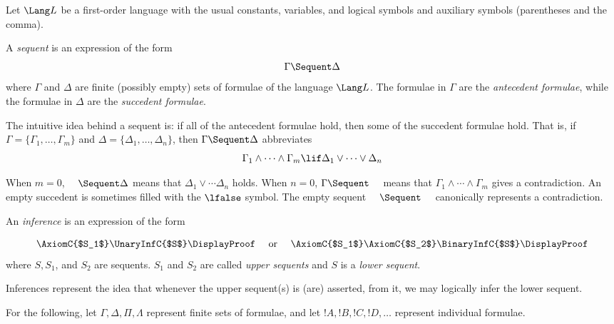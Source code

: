 \documentclass[../../include/open-logic-section]{subfiles}
\begin{document}


Let $\Lang L$ be a first-order language with the usual constants, variables, and logical symbols and auxiliary symbols (parentheses and the comma). 

\begin{defn}[sequent]
A \emph{sequent} is an expression of the form
\[ \Gamma \Sequent \Delta \]
where $\Gamma$ and $\Delta$ are finite (possibly empty) sets of formulae of the language $\Lang L$. The formulae in $\Gamma$ are the \emph{antecedent formulae}, while the formulae in $\Delta$ are the \emph{succedent formulae}. 

The intuitive idea behind a sequent is: if all of the antecedent formulae hold, then some of the succedent formulae hold. That is, if $\Gamma = \{ \Gamma_1,\ldots,\Gamma_m\}$ and $\Delta = \{ \Delta_1,\ldots, \Delta_n\}$, then $\Gamma \Sequent \Delta$ abbreviates
\[ \Gamma_1 \land \cdots \land \Gamma_m \lif \Delta_1 \lor \cdots \lor \Delta_n \]

When $m=0$, $\hspace{1em} \Sequent \Delta$ means that $\Delta_1 \lor \cdots \Delta_n$ holds. When $n=0$, $\Gamma \Sequent \hspace{1em}$ means that $\Gamma_1 \land \cdots \land \Gamma_m$ gives a contradiction. An empty succedent is sometimes filled with the $\lfalse$ symbol. The empty sequent $\hspace{1em} \Sequent \hspace{1em}$ canonically represents a contradiction.
\end{defn}

\begin{defn}[Inference]
An \emph{inference} is an expression of the form

\[
\AxiomC{$S_1$}
\UnaryInfC{$S$}
\DisplayProof
\quad
\textrm{  or  }
\quad
\AxiomC{$S_1$}
\AxiomC{$S_2$}
\BinaryInfC{$S$}
\DisplayProof
\]
where $S, S_1$, and $S_2$ are sequents. $S_1$ and $S_2$ are called \emph{upper sequents} and $S$ is a \emph{lower sequent}.

Inferences represent the idea that whenever the upper sequent(s) is (are) asserted, from it, we may logically infer the lower sequent.
\end{defn}

For the following, let $\Gamma, \Delta, \Pi, \Lambda$ represent finite sets of formulae, and let $!A, !B, !C, !D, \ldots$ represent individual formulae.
\end{document}
